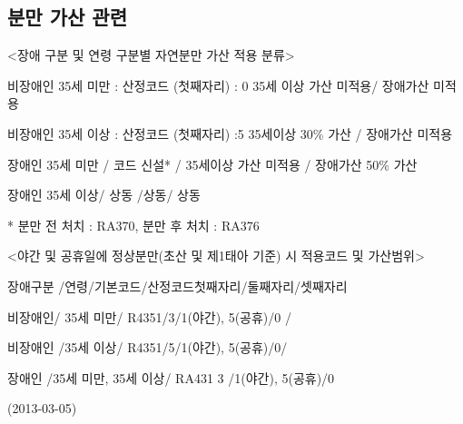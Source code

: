 \subsection{분만 가산 관련}

<장애 구분 및 연령 구분별 자연분만 가산 적용 분류> \par
비장애인 35세 미만 : 산정코드 (첫째자리) : 0 35세 이상 가산 미적용/ 장애가산 미적용\par
비장애인 35세 이상 : 산정코드 (첫째자리) :5 35세이상 30\% 가산 / 장애가산 미적용 \par
장애인 35세 미만 / 코드 신설* / 35세이상 가산 미적용 / 장애가산 50\% 가산 \par
장애인 35세 이상/ 상동 /상동/ 상동 \par
* 분만 전 처치 : RA370, 분만 후 처치 : RA376\par

\prezi{\clearpage}

<야간 및 공휴일에 정상분만(초산 및 제1태아 기준) 시 적용코드 및 가산범위>\par
  
장애구분 /연령/기본코드/산정코드첫째자리/둘째자리/셋째자리\par
비장애인/ 35세 미만/ R4351/3/1(야간), 5(공휴)/0 /\par
비장애인 /35세 이상/ R4351/5/1(야간), 5(공휴)/0/\par
장애인 /35세 미만, 35세 이상/ RA431 3 /1(야간), 5(공휴)/0 \par
(2013-03-05)


